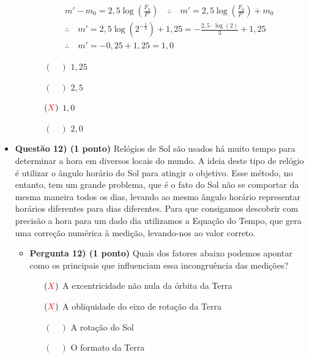 \documentclass[a4paper, 12pt]{article}
\newcommand{\red}[1]{\textcolor{red}{#1}}
\begin{document}
\begin{flushleft}
\begin{itemize}
\begin{itemize}
{\begin{itemize}
                                \begin{equation*} \begin{gathered}
                                    m'-m_0=2,5 \log \left(\frac{F_0}{F'}\right) \quad \therefore \quad m'=2,5 \log \left(\frac{F_0}{F'}\right)+m_0\\
                                    \therefore \quad m'=2,5 \log \left(2^{-\frac{1}{3}}\right)+1,25=-\frac{2,5 \cdot \log (2)}{3}+1,25\\
                                    \therefore \quad m'=-0,25 +1,25 =1,0
                                \end{gathered} \end{equation*}
                        \end{itemize}}
                        \begin{itemize}
                            \item[$(\quad)$] $1,25$
                            \item[$(\quad)$] $2,5$
                            \item[$(\red{X})$] $1,0$
                            \item[$(\quad)$] $2,0$
                        \end{itemize}
                \end{itemize}
            
            \item \textbf{Questão 12) (1 ponto)} Relógios de Sol são usados há muito tempo para determinar a hora em diversos locais do mundo. A ideia deste tipo de relógio é utilizar o ângulo horário do Sol para atingir o objetivo. Esse método, no entanto, tem um grande problema, que é o fato do Sol não se comportar da mesma maneira todos os dias, levando ao mesmo ângulo horário representar horários diferentes para dias diferentes. Para que consigamos descobrir com precisão a hora para um dado dia utilizamos a Equação do Tempo, que gera uma correção numérica à medição, levando-nos ao valor correto.
                \begin{itemize}
                    \item \textbf{Pergunta 12) (1 ponto)} Quais dos fatores abaixo podemos apontar como os principais que influenciam essa incongruência das medições?
                        \begin{itemize}
                            \item[$(\red{X})$] A excentricidade não nula da órbita da Terra
                            \item[$(\red{X})$] A obliquidade do eixo de rotação da Terra
                            \item[$(\quad)$] A rotação do Sol
                            \item[$(\quad)$] O formato da Terra
                        \end{itemize}
                \end{itemize}
        \end{itemize} \end{flushleft}
\end{document}
